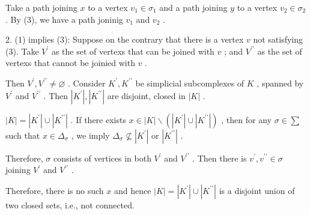 Take a path joining \(x\) to a vertex \({v}_{1} \in  {\sigma }_{1}\) and a path joining \(y\) to a vertex \({v}_{2} \in  {\sigma }_{2}\) . By (3), we have a path joninig \({v}_{1}\) and \({v}_{2}\) .

2. (1) implies (3): Suppose on the contrary that there is a vertex \(v\) not satisfying (3). Take \({V}^{\prime }\) as the set of vertexs that can be joined with \(v\) ; and \({V}^{\prime \prime }\) as the set of vertexs that cannot be joinied with \(v\) .

Then \({V}^{\prime },{V}^{\prime \prime } \neq  \varnothing\) . Consider \({K}^{\prime },{K}^{\prime \prime }\) be simplicial subcomplexes of \(K\) , spanned by \({V}^{\prime }\) and \({V}^{\prime \prime }\) . Then \(\left| {K}^{\prime }\right| ,\left| {K}^{\prime \prime }\right|\) are disjoint, closed in \(\left| K\right|\) .

\(\left| K\right|  = \left| {K}^{\prime }\right|  \cup  \left| {K}^{\prime \prime }\right|\) . If there exists \(x \in  \left| K\right|  \smallsetminus  \left( {\left| {K}^{\prime }\right|  \cup  \left| {K}^{\prime \prime }\right| }\right)\) , then for any \(\sigma  \in  \sum\) such that \(x \in  {\Delta }_{\sigma }\) , we imply \({\Delta }_{\sigma } \nsubseteq  \left| {K}^{\prime }\right|\) or \(\left| {K}^{\prime \prime }\right|\) .

Therefore, \(\sigma\) consists of vertices in both \({V}^{\prime }\) and \({V}^{\prime \prime }\) . Then there is \({v}^{\prime },{v}^{\prime \prime } \in  \sigma\) joining \({V}^{\prime }\) and \({V}^{\prime \prime }\) .

Therefore, there is no such \(x\) and hence \(\left| K\right|  = \left| {K}^{\prime }\right|  \cup  \left| {K}^{\prime \prime }\right|\) is a disjoint union of two closed sets, i.e., not connected.